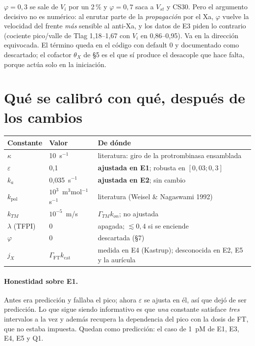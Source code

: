 \documentclass[11pt,a4paper]{article}
\begin{document}
\noindent
$\varphi=0{,}3$ se sale de $V_i$ por un 2\,\% y $\varphi=0{,}7$ saca a $V_{st}$ y
CS30. Pero el argumento decisivo no es numérico: al enrutar parte de la
\emph{propagación} por el Xa, $\varphi$ vuelve la velocidad del frente \emph{más}
sensible al anti-Xa, y los datos de E3 piden lo contrario (cociente pico/valle de
Tlag 1{,}18--1{,}67 con $V_i$ en 0{,}86--0{,}95). Va en la dirección equivocada. El
término queda en el código con default 0 y documentado como descartado; el cofactor
$\theta_X$ de §5 es el que sí produce el desacople que hace falta, porque actúa solo
en la iniciación.

\section{Qué se calibró con qué, después de los cambios}

\begin{center}
\small
\begin{tabular}{@{}llp{7.8cm}@{}}
\toprule
Constante & Valor & De dónde \\
\midrule
$\kappa$ & 10~s$^{-1}$ & literatura: giro de la protrombinasa ensamblada \\
$\varepsilon$ & 0{,}1 & \textbf{ajustada en E1}; robusta en $[0{,}03;0{,}3]$ \\
$k_a$ & 0{,}035~s$^{-1}$ & \textbf{ajustada en E2}; sin cambio \\
$k_{\mathrm{pol}}$ & $10^{3}$~m$^3$mol$^{-1}$s$^{-1}$ & literatura (Weisel \& Nagaswami 1992) \\
$k_{TM}$ & $10^{-5}$~m/s & $\Gamma_{TM}k_{on}$; no ajustada \\
$\lambda$ (TFPI) & 0 & apagada; $\lesssim0{,}4$ si se enciende \\
$\varphi$ & 0 & descartada (§7) \\
$j_X$ & $\Gamma_{\mathrm{FT}}k_{\mathrm{cat}}$ & medida en E4 (Kastrup); desconocida en E2, E5 y la aurícula \\
\bottomrule
\end{tabular}
\end{center}

\paragraph{Honestidad sobre E1.} Antes era predicción y fallaba el pico; ahora
$\varepsilon$ se ajusta en él, así que dejó de ser predicción. Lo que sigue siendo
informativo es que \emph{una} constante satisface \emph{tres} intervalos a la vez y
además recupera la dependencia del pico con la dosis de FT, que no estaba impuesta.
Quedan como predicción: el caso de 1~pM de E1, E3, E4, E5 y Q1.
\end{document}

